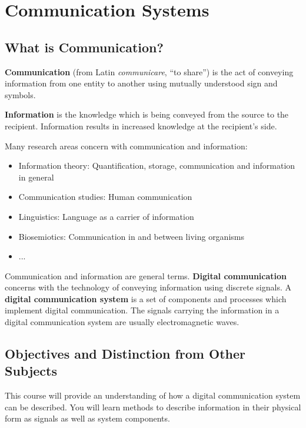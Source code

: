 \chapter{Communication Systems}

\begin{refsection}

\section{What is Communication?}

\textbf{Communication} (from Latin \emph{communicare}, ``to share'') is the act of conveying information from one entity to another using mutually understood sign and symbols.

\textbf{Information} is the knowledge which is being conveyed from the source to the recipient. Information results in increased knowledge at the recipient's side.

Many research areas concern with communication and information:
\begin{itemize}
	\item Information theory: Quantification, storage, communication and information in general
	\item Communication studies: Human communication
	\item Linguistics: Language as a carrier of information
	\item Biosemiotics: Communication in and between living organisms
	\item ...
\end{itemize}

Communication and information are general terms. \textbf{Digital communication} concerns with the technology of conveying information using discrete signals. A \textbf{digital communication system} is a set of components and processes which implement digital communication. The signals carrying the information in a digital communication system are usually electromagnetic waves.


\section{Objectives and Distinction from Other Subjects}

This course will provide an understanding of how a digital communication system can be described. You will learn methods to describe information in their physical form as signals as well as system components. 


\end{refsection}
